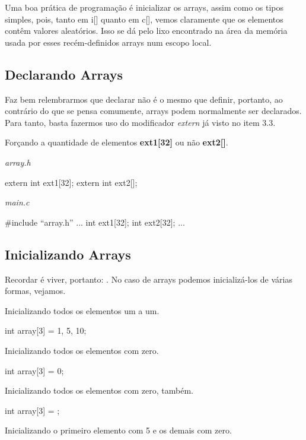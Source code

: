 Uma boa prática de programação é inicializar os arrays, assim como os tipos simples, pois, tanto em i[] quanto em c[], vemos claramente que os elementos contêm valores aleatórios. Isso se dá pelo lixo encontrado na área da memória usada por esses recém-definidos arrays num escopo local.


\subsection{Declarando Arrays}
Faz bem relembrarmos que declarar não é o mesmo que definir, portanto, ao contrário do que se pensa comumente, arrays podem normalmente ser declarados. Para tanto, basta fazermos uso do modificador \textit{extern} já visto no item 3.3.

Forçando a quantidade de elementos \textbf{ext1[32]} ou não \textbf{ext2[]}.

\textit{array.h}\\
\begin{ccode}
extern int ext1[32];
extern int ext2[];
\end{ccode}

\textit{main.c}\\
\begin{ccode}
#include ``array.h''
...
int ext1[32];
int ext2[32];
...
\end{ccode}


\subsection{Inicializando Arrays}
Recordar é viver, portanto: . No caso de arrays podemos inicializá-los de várias formas, vejamos.

Inicializando todos os elementos um a um.

\begin{ccode}
  int array[3] = {1, 5, 10};
\end{ccode}

Inicializando todos os elementos com zero.

\begin{ccode}
  int array[3] = {0};
\end{ccode}

Inicializando todos os elementos com zero, também.

\begin{ccode}
  int array[3] = {};
\end{ccode}

Inicializando o primeiro elemento com 5 e os demais com zero.

